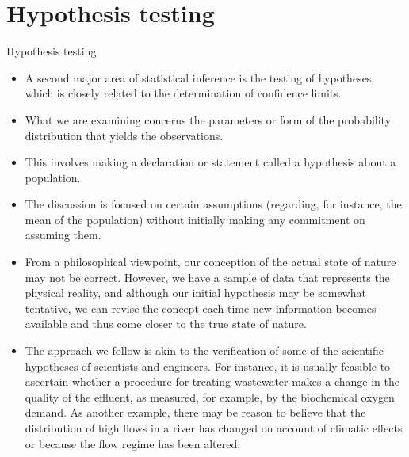 \documentclass[8pt]{beamer}
\renewcommand{\emph}[1]{\textcolor{myorange}{#1}}
\begin{document}
\section{Hypothesis testing}
\begin{frame}{Hypothesis testing}
    \begin{itemize}
        \item A second major area of statistical inference is the \alert{testing of hypotheses}, which is closely related to the determination of \emph{confidence limits}. 
        \item What we are examining concerns the parameters or form of the probability distribution that yields the observations.
        \item This involves making a declaration or statement called a \alert{hypothesis} about a population.
        \item The discussion is focused on certain \emph{assumptions} (regarding, for instance, the mean of the population) without initially making any commitment on assuming them.
        \item From a philosophical viewpoint, our \emph{conception} of the actual state of nature may \emph{not be correct}. However, we have a sample of data that represents the physical reality, and although our initial hypothesis may be somewhat tentative, we can \emph{revise} the concept each time \emph{new information} becomes available and thus come closer to the \emph{true state} of nature.
        \item The approach we follow is akin to the \emph{verification} of some of the scientific \emph{hypotheses} of scientists and engineers. For instance, it is usually feasible to ascertain whether a procedure for treating wastewater makes a change in the quality of the effluent, as measured, for example, by the biochemical oxygen demand. As another example, there may be reason to believe that the distribution of high flows in a river has changed on account of climatic effects or because the flow regime has been altered.
    \end{itemize}
\end{frame}
\end{document}
